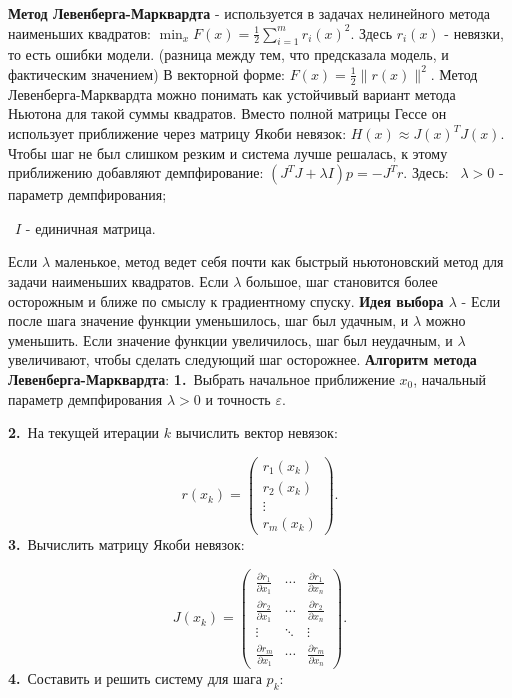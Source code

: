 \documentclass[12pt,a4paper]{article}
\begin{document}
\textbf{Метод Левенберга-Марквардта} - используется в задачах нелинейного метода наименьших квадратов: $\min_x F(x)=\frac12\sum_{i=1}^m r_i(x)^2.$
Здесь $r_i(x)$ - невязки, то есть ошибки модели. (разница между тем, что предсказала модель, и фактическим значением)
В векторной форме: $F(x)=\frac12\|r(x)\|^2.$
Метод Левенберга-Марквардта можно понимать как устойчивый вариант метода Ньютона для такой суммы квадратов. Вместо полной матрицы Гессе он использует приближение через матрицу Якоби невязок: $H(x)\approx J(x)^TJ(x).$
Чтобы шаг не был слишком резким и система лучше решалась, к этому приближению добавляют демпфирование: $(J^TJ+\lambda I)p=-J^Tr.$
Здесь:
\noindent\textbullet\ $\lambda>0$ - параметр демпфирования;\par
\noindent\textbullet\ $I$ - единичная матрица.\par
Если $\lambda$ маленькое, метод ведет себя почти как быстрый ньютоновский метод для задачи наименьших квадратов.
Если $\lambda$ большое, шаг становится более осторожным и ближе по смыслу к градиентному спуску.
\textbf{Идея выбора $\lambda$} - Если после шага значение функции уменьшилось, шаг был удачным, и $\lambda$ можно уменьшить.
Если значение функции увеличилось, шаг был неудачным, и $\lambda$ увеличивают, чтобы сделать следующий шаг осторожнее.
\textbf{Алгоритм метода Левенберга-Марквардта}:
\noindent\textbf{1.}\ Выбрать начальное приближение $x_0$, начальный параметр демпфирования $\lambda>0$ и точность $\varepsilon$.\par
\noindent\textbf{2.}\ На текущей итерации $k$ вычислить вектор невязок:\par
\[
r(x_k)=
\begin{pmatrix}
r_1(x_k)\\
r_2(x_k)\\
\vdots\\
r_m(x_k)
\end{pmatrix}.
\]
\noindent\textbf{3.}\ Вычислить матрицу Якоби невязок:\par
\[
J(x_k)=
\begin{pmatrix}
\frac{\partial r_1}{\partial x_1} & \cdots & \frac{\partial r_1}{\partial x_n}\\
\frac{\partial r_2}{\partial x_1} & \cdots & \frac{\partial r_2}{\partial x_n}\\
\vdots & \ddots & \vdots\\
\frac{\partial r_m}{\partial x_1} & \cdots & \frac{\partial r_m}{\partial x_n}
\end{pmatrix}.
\]
\noindent\textbf{4.}\ Составить и решить систему для шага $p_k$:\par
\end{document}

